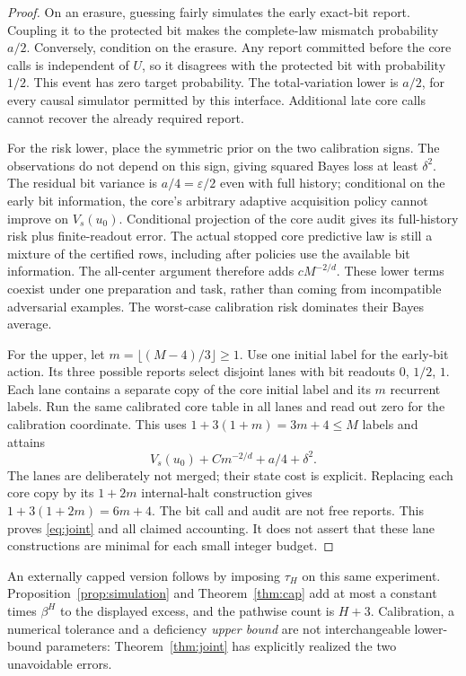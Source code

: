 \begin{proof}
On an erasure, guessing fairly simulates the early exact-bit report. Coupling it to the protected bit makes the complete-law mismatch probability $a/2$. Conversely, condition on the erasure. Any report committed before the core calls is independent of $U$, so it disagrees with the protected bit with probability $1/2$. This event has zero target probability. The total-variation lower is $a/2$, for every causal simulator permitted by this interface. Additional late core calls cannot recover the already required report.

For the risk lower, place the symmetric prior on the two calibration signs. The observations do not depend on this sign, giving squared Bayes loss at least $\delta^2$. The residual bit variance is $a/4=\varepsilon/2$ even with full history; conditional on the early bit information, the core's arbitrary adaptive acquisition policy cannot improve on $V_s(u_0)$. Conditional projection of the core audit gives its full-history risk plus finite-readout error. The actual stopped core predictive law is still a mixture of the certified rows, including after policies use the available bit information. The all-center argument therefore adds $cM^{-2/d}$. These lower terms coexist under one preparation and task, rather than coming from incompatible adversarial examples. The worst-case calibration risk dominates their Bayes average.

For the upper, let $m=\lfloor(M-4)/3\rfloor\ge1$. Use one initial label for the early-bit action. Its three possible reports select disjoint lanes with bit readouts $0$, $1/2$, $1$. Each lane contains a separate copy of the core initial label and its $m$ recurrent labels. Run the same calibrated core table in all lanes and read out zero for the calibration coordinate. This uses $1+3(1+m)=3m+4\le M$ labels and attains
\[
 V_s(u_0)+Cm^{-2/d}+a/4+\delta^2.
\]
The lanes are deliberately not merged; their state cost is explicit. Replacing each core copy by its $1+2m$ internal-halt construction gives $1+3(1+2m)=6m+4$. The bit call and audit are not free reports. This proves \eqref{eq:joint} and all claimed accounting. It does not assert that these lane constructions are minimal for each small integer budget.
\end{proof}

An externally capped version follows by imposing $\tau_H$ on this same experiment. Proposition~\ref{prop:simulation} and Theorem~\ref{thm:cap} add at most a constant times $\beta^H$ to the displayed excess, and the pathwise count is $H+3$. Calibration, a numerical tolerance and a deficiency \emph{upper bound} are not interchangeable lower-bound parameters: Theorem~\ref{thm:joint} has explicitly realized the two unavoidable errors.
